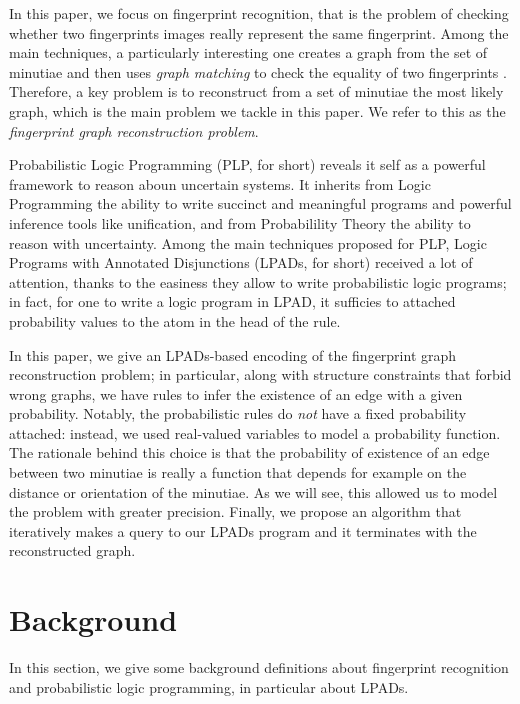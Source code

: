 \documentclass[8pt]{article}
\begin{document}
In this paper, we focus on fingerprint recognition, that is the problem of
checking whether two fingerprints images really represent the same fingerprint.
%
Among the main techniques, a particularly interesting one creates a graph from
the set of minutiae and then uses \emph{graph matching} to check the equality
of two fingerprints \cite{isenor1986fingerprint}. Therefore, a key problem is
to reconstruct from a set of minutiae the most likely graph, which is the main
problem we tackle in this paper. We refer to this as the \emph{fingerprint
graph reconstruction problem}.

Probabilistic Logic Programming (PLP, for short) reveals it self as a powerful
framework to reason aboun uncertain systems. It inherits from Logic Programming
the ability to write succinct and meaningful programs and powerful inference
tools like unification, and from Probabilility Theory the ability to reason
with uncertainty.
Among the main techniques proposed for PLP, Logic Programs with Annotated
Disjunctions (LPADs, for short) received a lot of attention, thanks to the
easiness they allow to write probabilistic logic programs; in fact, for one to
write a logic program in LPAD, it sufficies to attached probability values to
the atom in the head of the rule.

In this paper, we give an LPADs-based encoding of the fingerprint graph
reconstruction problem; in particular, along with structure constraints that
forbid wrong graphs, we have rules to infer the existence of an edge with
a given probability. Notably, the probabilistic rules do \emph{not} have
a fixed probability attached: instead, we used real-valued variables to model
a probability function. The rationale behind this choice is that the
probability of existence of an edge between two minutiae is really a function
that depends for example on the distance or orientation of the minutiae. As we
will see, this allowed us to model the problem with greater precision.
Finally, we propose an algorithm that iteratively makes a query to our LPADs
program and it terminates with the reconstructed graph. 



\section{Background}
\label{sec:background}
In this section, we give some background definitions about fingerprint
recognition and probabilistic logic programming, in particular about LPADs.
\end{document}
